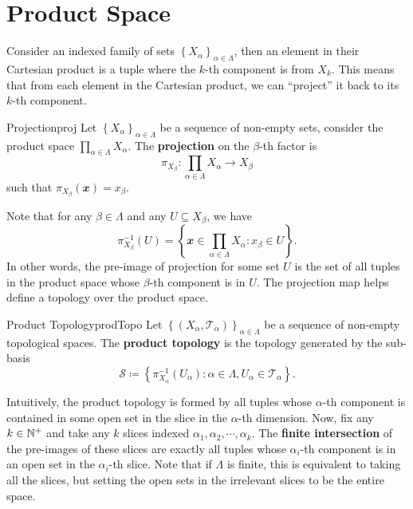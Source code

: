 \documentclass[math]{amznotes}
\theoremstyle{remark}
\begin{document}
\section{Product Space}
Consider an indexed family of sets $\left\{X_{\alpha}\right\}_{\alpha \in \Lambda}$, then an element in their Cartesian product is a tuple where the $k$-th component is from $X_k$. This means that from each element in the Cartesian product, we can ``project'' it back to its $k$-th component.
\begin{dfnbox}{Projection}{proj}
    Let $\left\{X_{\alpha}\right\}_{\alpha \in \Lambda}$ be a sequence of non-empty sets, consider the product space $\prod_{\alpha \in \Lambda}X_{\alpha}$. The {\color{red} \textbf{projection}} on the $\beta$-th factor is 
    \begin{equation*}
        \pi_{X_{\beta}} \colon \prod_{\alpha \in \Lambda}X_{\alpha} \to X_{\beta}
    \end{equation*}
    such that $\pi_{X_{\beta}}\left(\mathbfit{x}\right) = x_{\beta}$.
\end{dfnbox}
Note that for any $\beta \in \Lambda$ and any $U \subseteq X_{\beta}$, we have
\begin{equation*}
    \pi_{X_{\beta}}^{-1}\left(U\right) = \left\{\mathbfit{x} \in \prod_{\alpha \in \Lambda}X_{\alpha} \colon x_{\beta} \in U\right\}.
\end{equation*}
In other words, the pre-image of projection for some set $U$ is the set of all tuples in the product space whose $\beta$-th component is in $U$. The projection map helps define a topology over the product space.
\begin{dfnbox}{Product Topology}{prodTopo}
    Let $\left\{\left(X_{\alpha}, \mathcal{T}_{\alpha}\right)\right\}_{\alpha \in \Lambda}$ be a sequence of non-empty topological spaces. The {\color{red} \textbf{product topology}} is the topology generated by the sub-basis 
    \begin{equation*}
        \mathcal{S} \coloneqq \left\{\pi_{X_{\alpha}}^{-1}\left(U_{\alpha}\right) \colon \alpha \in \Lambda, U_{\alpha} \in \mathcal{T}_{\alpha}\right\}.
    \end{equation*}
\end{dfnbox}
Intuitively, the product topology is formed by all tuples whose $\alpha$-th component is contained in some open set in the slice in the $\alpha$-th dimension. Now, fix any $k \in \mathbb{N}^+$ and take any $k$ slices indexed $\alpha_1, \alpha_2, \cdots, \alpha_k$. The \textbf{finite intersection} of the pre-images of these slices are exactly all tuples whose $\alpha_i$-th component is in an open set in the $\alpha_i$-th slice. Note that if $\Lambda$ is finite, this is equivalent to taking all the slices, but setting the open sets in the irrelevant slices to be the entire space.
\end{document}
